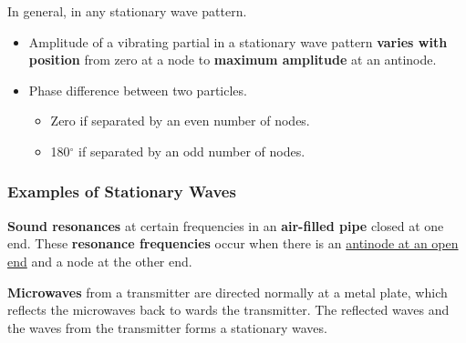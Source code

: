 In general, in any stationary wave pattern.
\begin{itemize}
    \item Amplitude of a vibrating partial in a stationary wave pattern \textbf{varies with position} from zero at a node to \textbf{maximum amplitude} at an antinode.
    \item Phase difference between two particles.
        \begin{itemize}
            \item Zero if separated by an even number of nodes.
            \item 180$^\circ$ if separated by an odd number of nodes.
        \end{itemize}
\end{itemize}

\subsubsection*{Examples of Stationary Waves}
\textbf{Sound resonances} at certain frequencies in an \textbf{air-filled pipe} closed at one end. These \textbf{resonance frequencies} occur when there is an \underline{antinode at an open end} and a node at the other end.

\textbf{Microwaves} from a transmitter are directed normally at a metal plate, which reflects the microwaves back to wards the transmitter. The reflected waves and the waves from the transmitter forms a stationary waves.
